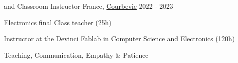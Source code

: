 \begin{cventries}
	\cventry
	{\esilv  and \emlv} %
	{Classroom Instructor} %
	{France, \href{https://www.ville-courbevoie.fr/}{Courbevie}} %
	{2022 - 2023} %
	{
		\begin{cvitems} %
			\item {Electronics final Class teacher (25h)}
			\item {Instructor at the Devinci Fablab in Computer Science and Electronics (120h)}
		\end{cvitems}
	}
	{
		\begin{cvitemsskills} %
			\item {Teaching, Communication, Empathy \& Patience}
		\end{cvitemsskills}
	}

\end{cventries}
